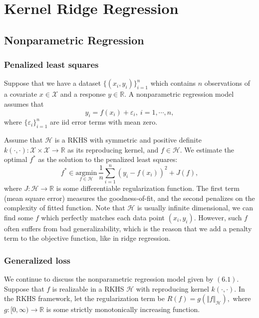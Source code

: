 \documentclass{article}
\begin{document}
\newpage

\section{Kernel Ridge Regression}
\subsection{Nonparametric Regression}
\subsubsection{Penalized least squares}
Suppose that we have a dataset $\lbrace (x_i,y_i)\rbrace_{i=1}^n$ which contains $n$ observations of a covariate $x\in\mathcal{X}$ and a response $y\in\mathbb{R}.$ A nonparametric regression model assumes that
\begin{equation*}
	y_i = f(x_i) + \varepsilon_i,\ i=1,\cdots,n,\tag{6.1}
\end{equation*}
where $\lbrace\varepsilon_i\rbrace_{i=1}^n$ are iid error terms with mean zero. 

Assume that $\mathcal{H}$ is a RKHS with symmetric and positive definite $k(\cdot,\cdot):\mathcal{X}\times\mathcal{X}\to\mathbb{R}$ as its reproducing kernel, and $f\in\mathcal{H}.$ We estimate the optimal $f^*$ as the solution to the penalized least squares:
\begin{equation*}
	f^* \in \underset{f\in\mathcal{H}}{\mathrm{argmin}}\ \frac{1}{n}\sum_{i=1}^n\left(y_i - f(x_i)\right)^2 + J(f),\tag{6.2}
\end{equation*}
where $J:\mathcal{H}\to\mathbb{R}$ is some differentiable regularization function. The first term (mean square error) measures the goodness-of-fit, and the second penalizes on the complexity of fitted function. Note that $\mathcal{H}$ is usually infinite dimensional, we can find some $f$ which perfectly matches each data point $(x_i,y_i)$. However, such $f$ often suffers from bad generalizability, which is the reason that we add a penalty term to the objective function, like in ridge regression.

\subsubsection{Generalized loss}
We continue to discuss the nonparametric regression model given by $(6.1)$. Suppose that $f$ is realizable in a RKHS $\mathcal{H}$ with reproducing kernel $k(\cdot,\cdot)$. In the RKHS framework, let the regularization term be $R(f)=g(\Vert f\Vert_\mathcal{H}),$ where $g:[0,\infty)\to\mathbb{R}$ is some strictly monotonically increasing function.
\end{document}
